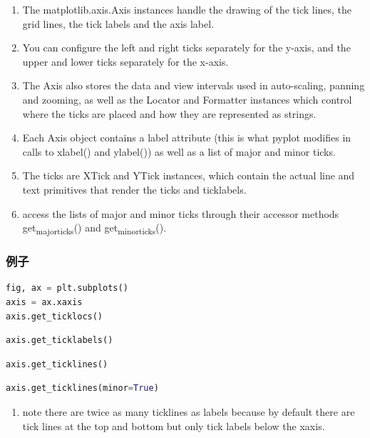 \documentclass[UTF8,a4paper,12pt]{ctexart}  %
\providecommand{\tightlist}{\setlength{\itemsep}{0pt}\setlength{\parskip}{0pt}}
\begin{document}
\begin{enumerate}
\def\labelenumi{\arabic{enumi}.}
\tightlist
\item
  The matplotlib.axis.Axis instances handle the drawing of the tick
  lines, the grid lines, the tick labels and the axis label.
\item
  You can configure the left and right ticks separately for the
  y-axis, and the upper and lower ticks separately for the x-axis.
\item
  The Axis also stores the data and view intervals used in
  auto-scaling, panning and zooming, as well as the Locator and
  Formatter instances which control where the ticks are placed and how
  they are represented as strings.
\item
  Each Axis object contains a label attribute (this is what pyplot
  modifies in calls to xlabel() and ylabel()) as well as a list of
  major and minor ticks.
\item
  The ticks are XTick and YTick instances, which contain the actual
  line and text primitives that render the ticks and ticklabels.
\item
  access the lists of major and minor ticks through their accessor
  methods get\textsubscript{majorticks}() and get\textsubscript{minorticks}().
\end{enumerate}

\hypertarget{ux4f8bux5b50-5}{%
\subsubsection{例子}\label{ux4f8bux5b50-5}}

\begin{lstlisting}[language=Python]
fig, ax = plt.subplots()
axis = ax.xaxis
axis.get_ticklocs()
\end{lstlisting}

\begin{lstlisting}[language=Python]
axis.get_ticklabels()
\end{lstlisting}

\begin{lstlisting}[language=Python]
axis.get_ticklines()
\end{lstlisting}

\begin{lstlisting}[language=Python]
axis.get_ticklines(minor=True)
\end{lstlisting}

\begin{enumerate}
\def\labelenumi{\arabic{enumi}.}
\tightlist
\item
  note there are twice as many ticklines as labels because by default
  there are tick lines at the top and bottom but only tick labels
  below the xaxis.
\end{enumerate}
\end{document}
